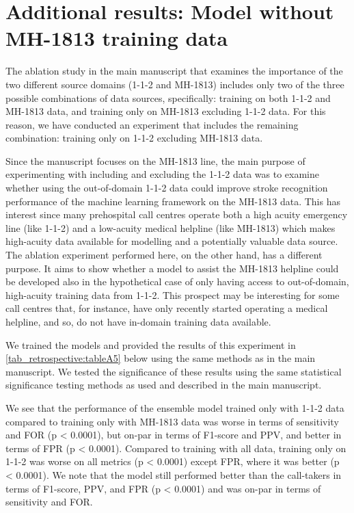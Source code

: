 {\section{Additional results: Model without MH-1813 training data}
%
The ablation study in the main manuscript that examines the importance of the two different source domains (1-1-2 and MH-1813) includes only two of the three possible combinations of data sources, specifically: training on both 1-1-2 and MH-1813 data, and training only on MH-1813 excluding 1-1-2 data. For this reason, we have conducted an experiment that includes the remaining combination: training only on 1-1-2 excluding MH-1813 data.

Since the manuscript focuses on the MH-1813 line, the main purpose of experimenting with including and excluding the 1-1-2 data was to examine whether using the out-of-domain 1-1-2 data could improve stroke recognition performance of the machine learning framework on the MH-1813 data. This has interest since many prehospital call centres operate both a high acuity emergency line (like 1-1-2) and a low-acuity medical helpline (like MH-1813) which makes high-acuity data available for modelling and a potentially valuable data source. The ablation experiment performed here, on the other hand, has a different purpose. It aims to show whether a model to assist the MH-1813 helpline could be developed also in the hypothetical case of only having access to out-of-domain, high-acuity training data from 1-1-2. This prospect may be interesting for some call centres that, for instance, have only recently started operating a medical helpline, and so, do not have in-domain training data available.

We trained the models and provided the results of this experiment in \cref{tab_retrospective:tableA5} below using the same methods as in the main manuscript. We tested the significance of these results using the same statistical significance testing methods as used and described in the main manuscript.

We see that the performance of the ensemble model trained only with 1-1-2 data compared to training only with MH-1813 data was worse in terms of sensitivity and FOR (p < 0.0001), but on-par in terms of F1-score and PPV, and better in terms of FPR (p < 0.0001). Compared to training with all data, training only on 1-1-2 was worse on all metrics (p < 0.0001) except FPR, where it was better (p < 0.0001). We note that the model still performed better than the call-takers in terms of F1-score, PPV, and FPR (p < 0.0001) and was on-par in terms of sensitivity and FOR.

}
